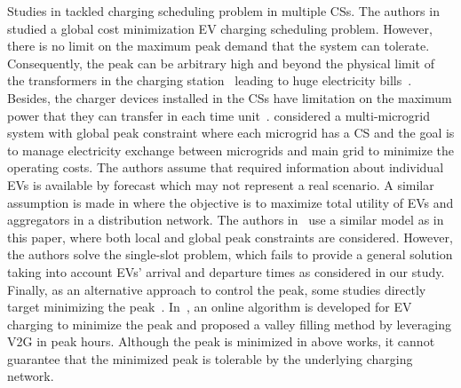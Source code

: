 \documentclass[journal]{IEEEtran}
\newcommand{\rev}[1]{{\color{black}#1}}%
\newcommand{\rev}[1]{#1}
\begin{document}
Studies in \cite{He,malhotra2017distributed,Moradijoz,DWang,Zeng,Shaaban} tackled charging scheduling problem in multiple CSs. The authors in~\cite{He} studied a global cost minimization EV charging scheduling problem. However, there is no limit on the maximum peak demand that the system can tolerate. Consequently, the peak can be arbitrary high and beyond the physical limit of the transformers in the charging station~\cite{lee2016adaptive} leading to huge electricity bills~\cite{Zhang2015eEnergy}. Besides, the charger devices installed in the CSs have limitation on the maximum power that they can transfer in each time unit~\cite{Tesla}. 
\cite{DWang} considered a multi-microgrid system with global peak constraint where each microgrid has a CS and the goal is to manage electricity exchange between microgrids and main grid to minimize the operating costs. The authors assume that required information about individual EVs is available by forecast which may not represent a real scenario. A similar assumption is made in \cite{Zeng,Shaaban} where the objective is to maximize total utility of EVs and aggregators in a distribution network.
The authors in~\cite{malhotra2017distributed} use a similar model as in this paper, where both local and global peak constraints are considered. However, the authors solve the single-slot problem, which fails to provide a general solution taking into account EVs' arrival and departure times as considered in our study.
Finally, as an alternative approach to control the peak, some studies directly target minimizing the peak~\cite{Zhao, Karfopoulos}. In~\cite{Zhao}, an online algorithm is developed for EV charging to minimize the peak and \cite{Karfopoulos} proposed a valley filling method by leveraging V2G in peak hours. Although the peak is minimized in above works, it cannot guarantee that the minimized peak is tolerable by the underlying charging network.
\end{document}
